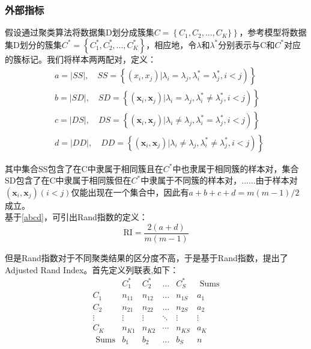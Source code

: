\subsubsection{外部指标}
假设通过聚类算法将数据集D划分成簇集$C=\left\{C_1,C_2,...,C_K\}\right\}$，参考模型将数据集D划分的簇集$C^*=\left\{ C_{1}^{*},C_{2}^{*},...,C_{K}^{*} \right\} $，相应地，令$\lambda$和$\lambda^{*}$分别表示与C和$C^{*}$对应的簇标记。我们将样本两两配对，定义：
\begin{equation}
\label{abcd}
\begin{aligned}
&\left.a=|S S|, \quad S S=\left\{\left(x_{i}, x_{j}\right) | \lambda_{i}=\lambda_{j}, \lambda_{i}^{*}=\lambda_{j}^{*}, i<j\right)\right\}\\
&\left.b=|S D|, \quad S D=\left\{\left(\boldsymbol{x}_{i}, \boldsymbol{x}_{j}\right) | \lambda_{i}=\lambda_{j}, \lambda_{i}^{*} \neq \lambda_{j}^{*}, i<j\right)\right\}\\
&\left.c=|D S|, \quad D S=\left\{\left(\boldsymbol{x}_{i}, \boldsymbol{x}_{j}\right) | \lambda_{i} \neq \lambda_{j}, \lambda_{i}^{*}=\lambda_{j}^{*}, i<j\right)\right\}\\
&\left.d=|D D|, \quad D D=\left\{\left(\boldsymbol{x}_{i}, \boldsymbol{x}_{j}\right) | \lambda_{i} \neq \lambda_{j}, \lambda_{i}^{*} \neq \lambda_{j}^{*}, i<j\right)\right\}
\end{aligned}
\end{equation}

其中集合SS包含了在C中隶属于相同簇且在$C^{*}$中也隶属于相同簇的样本对，集合SD包含了在C中隶属于相同簇但在$C^{*}$中隶属于不同簇的样本对，......由于样本对$\left(\boldsymbol{x}_{i}, \boldsymbol{x}_{j}\right)(i<j)$仅能出现在一个集合中，因此有$a+b+c+d=m(m-1) / 2$成立。\\
基于\ref{abcd}，可引出Rand指数的定义：
\begin{equation}
\label{RI}
\mathrm{RI}=\frac{2(a+d)}{m(m-1)}
\end{equation}

但是Rand指数对于不同聚类结果的区分度不高，于是基于Rand指数，提出了Adjusted Rand Index。首先定义列联表,如下：
\[
\begin{array}{c|ccccc}
	&		C_{1}^{*}&		C_{2}^{*}&		\dots&		C_{S}^{*}&		\,\,\text{Sums}\\
	\hline
	C_1&		n_{11}&		n_{12}&		\dots&		n_{1S}&		a_1\\
	C_2&		n_{21}&		n_{22}&		\dots&		n_{2S}&		a_2\\
	\vdots&		\vdots&		\vdots&		\ddots&		\vdots&		\vdots\\
	C_K&		n_{K1}&		n_{K2}&		\cdots&		n_{KS}&		a_K\\
	\hline
	\,\,\text{Sums}&		b_1&		b_2&		\dots&		b_S&		n\\
\end{array}
\]

